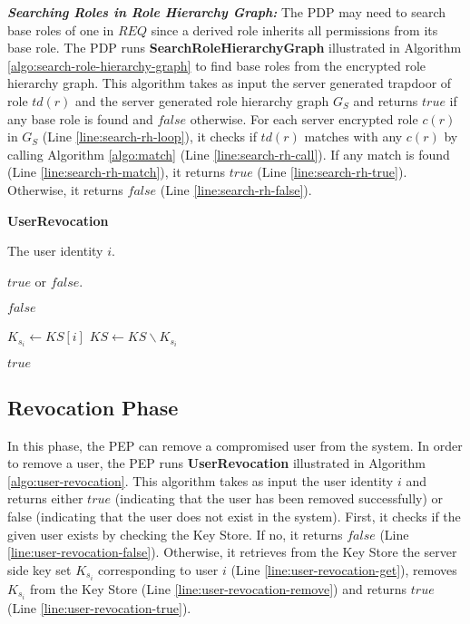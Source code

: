 \documentclass[final,5p,times,twocolumn]{elsarticle}
\newcommand{\algofontsize}{\fontsize{7}{8}\selectfont}
\begin{document}
\emph{\textbf{Searching Roles in Role Hierarchy Graph:}}
The PDP may need to search base roles of one in $\mathit{REQ}$ since a derived role inherits all permissions from its base role. The PDP runs \textbf{SearchRoleHierarchyGraph} illustrated in Algorithm \ref{algo:search-role-hierarchy-graph} to find base roles from the encrypted role hierarchy graph. This algorithm takes as input the server generated trapdoor of role $td(r)$ and the server generated role hierarchy graph $G_{S}$ and returns $\mathit{true}$ if any base role is found and $\mathit{false}$ otherwise. For each server encrypted role $c(r)$ in $G_{S}$ (Line \ref{line:search-rh-loop}), it checks if $td(r)$ matches with any $c(r)$ by calling Algorithm \ref{algo:match} (Line \ref{line:search-rh-call}). If any match is found (Line \ref{line:search-rh-match}), it returns $\mathit{true}$ (Line \ref{line:search-rh-true}). Otherwise, it returns $\mathit{false}$ (Line \ref{line:search-rh-false}).




\begin{algorithm}[htp]
{\algofontsize
\caption{\textbf{UserRevocation}}

\label{algo:user-revocation}

\begin{algorithmic}[1]

\REQUIRE The user identity $i$.

\ENSURE $\mathit{true}$ or $\mathit{false}$.

\medskip

 \label{line:user-revocation-exist}

	\RETURN $\mathit{false}$ \label{line:user-revocation-false}

\ENDIF

\STATE $K_{s_i} \leftarrow KS[i]$ \label{line:user-revocation-get}
\STATE $KS \leftarrow KS \backslash K_{s_i}$ \label{line:user-revocation-remove}

\RETURN $\mathit{true}$ \label{line:user-revocation-true}

\end{algorithmic}
}
\end{algorithm}


\subsection{Revocation Phase}
In this phase, the PEP can remove a compromised user from the system. In order to remove a user, the PEP runs \textbf{UserRevocation} illustrated in Algorithm \ref{algo:user-revocation}. This algorithm takes as input the user identity $i$ and returns either $\mathit{true}$ (indicating that the user has been removed successfully) or false (indicating that the user does not exist in the system). First, it checks if the given user exists by checking the Key Store. If no, it returns $\mathit{false}$ (Line \ref{line:user-revocation-false}). Otherwise, it retrieves from the Key Store the server side key set $K_{s_i}$ corresponding to user $i$ (Line \ref{line:user-revocation-get}), removes $K_{s_i}$ from the Key Store (Line \ref{line:user-revocation-remove}) and returns $\mathit{true}$ (Line \ref{line:user-revocation-true}).
\end{document}
